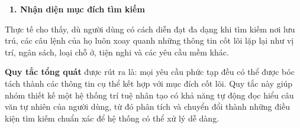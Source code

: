 \documentclass[12pt, a4paper]{article}
\begin{document}
\vspace{0.2cm}
\noindent\textcolor{blue!80!black}{\textbf{\faSearch \ 1. Nhận diện mục đích tìm kiếm}}
\vspace{0.15cm}

\begin{tcolorbox}[blanker, borderline west={3pt}{0pt}{blue!60!black}, left=12pt, top=2pt, bottom=2pt]
Thực tế cho thấy, dù người dùng có cách diễn đạt đa dạng khi tìm kiếm nơi lưu trú, các câu lệnh của họ luôn xoay quanh những thông tin cốt lõi lặp lại như vị trí, ngân sách, loại chỗ ở, tiện nghi và các yêu cầu mềm khác.

\vspace{0.15cm}
\noindent \textbf{Quy tắc tổng quát} được rút ra là: mọi yêu cầu phức tạp đều có thể được bóc tách thành các thông tin cụ thể kết hợp với mục đích cốt lõi. Quy tắc này giúp nhóm thiết kế một hệ thống trí tuệ nhân tạo có khả năng tự động đọc hiểu câu văn tự nhiên của người dùng, từ đó phân tích và chuyển đổi thành những điều kiện tìm kiếm chuẩn xác để hệ thống có thể xử lý dễ dàng.
\end{tcolorbox}
\end{document}
